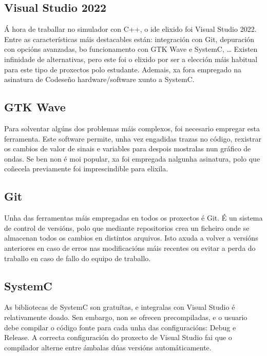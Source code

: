 \subsection{Visual Studio 2022}\label{sec:visual_studio}
Á hora de traballar no simulador con C++, o \acrshort{ide} elixido foi Visual Studio 2022. Entre as características máis destacables están: integración con Git, depuración con opcións avanzadas, bo funcionamento con GTK Wave e SystemC, \dots{}  Existen infinidade de alternativas, pero este foi o elixido por ser a elección máis habitual para este tipo de proxectos polo estudante. Ademais, xa fora empregado na asinatura de Codeseño \gls{hardware}/\gls{software} xunto a SystemC. 

\subsection{GTK Wave}\label{sec:gtkwave}
Para solventar algúns dos problemas máis complexos, foi necesario empregar esta ferramenta. Este software permite, unha vez engadidas trazas no código, rexistrar os cambios de valor de sinais e variables para despois mostralas nun gráfico de ondas. Se ben non é moi popular, xa foi empregada nalgunha asinatura, polo que  coñecela previamente foi imprescindible para elixila.

\subsection{Git}\label{sec:git}
Unha das ferramentas máis empregadas en todos os proxectos é Git. É un sistema de control de versións, polo que mediante repositorios crea un ficheiro onde se almacenan todos os cambios en distintos arquivos. Isto axuda a volver a versións anteriores en caso de erros nas modificacións máis recentes ou evitar a perda do traballo en caso de fallo do equipo de traballo.


\subsection{SystemC}\label{sec:imp_systemC}
As bibliotecas de SystemC son gratuítas, e integralas con Visual Studio é relativamente doado. Sen embargo, non se ofrecen precompiladas, e o usuario debe compilar o código fonte para cada unha das configuracións: Debug e Release. A correcta configuración do proxecto de Visual Studio fai que o compilador alterne entre ámbalas dúas versións automáticamente.



